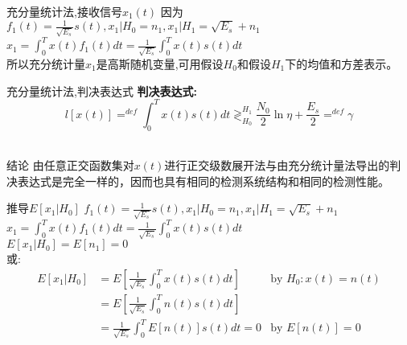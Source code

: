 \begin{frame}{充分量统计法,接收信号$x_1(t)$}
因为$f_1(t)=\frac{1}{\sqrt{E_s}}s(t),x_1|H_0=n_1,x_1|H_1=\sqrt{E_s}+n_1$\\ $x_1=\int_{0}^{T}x(t)f_1(t)dt=\frac{1}{\sqrt{E_s}}\int_{0}^{T}x(t)s(t)dt$\\
所以充分统计量$x_1$是高斯随机变量,可用假设$H_0$和假设$H_1$下的均值和方差表示。
\end{frame}

\begin{frame}{充分量统计法,判决表达式}
\textbf{判决表达式:}
\[l[x(t)]\mathop{=}^{def}\int_{0}^{T}x(t)s(t)dt\mathop{\gtrless}_{H_0}^{H_1}\frac{N_0}{2}\ln\eta+\frac{E_s}{2}\mathop{=}^{def}\gamma \]
~\\
\begin{block}{结论}
由任意正交函数集对$x(t)$进行正交级数展开法与由充分统计量法导出的判决表达式是完全一样的，因而也具有相同的检测系统结构和相同的检测性能。
\end{block}
\end{frame}

\begin{frame}{推导$E[x_1|H_0]$}
$f_1(t)=\frac{1}{\sqrt{E_s}}s(t),x_1|H_0=n_1,x_1|H_1=\sqrt{E_s}+n_1$\\ $x_1=\int_{0}^{T}x(t)f_1(t)dt=\frac{1}{\sqrt{E_s}}\int_{0}^{T}x(t)s(t)dt$\\
$E[x_1|H_0]=E[n_1]=0$\\
或:
\begin{align*}
E[x_1|H_0]&=E\left[\frac{1}{\sqrt{E_s}}\int_{0}^{T}x(t)s(t)dt\right] &\text{by }H_0: x(t)=n(t)\\
&=E\left[\frac{1}{\sqrt{E_s}}\int_{0}^{T}n(t)s(t)dt\right]&\\
&=\frac{1}{\sqrt{E_s}}\int_{0}^{T}E[n(t)]s(t)dt=0 &\text{by }E[n(t)]=0
\end{align*}
\end{frame}

